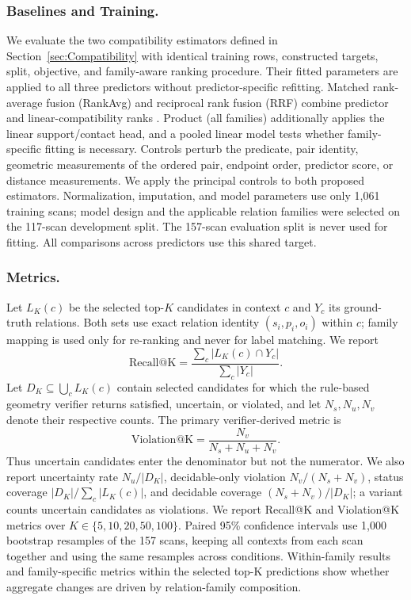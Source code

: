\documentclass[letterpaper]{article}
\begin{document}
\subsubsection{Baselines and Training.}
We evaluate the two compatibility estimators defined in Section~\ref{sec:Compatibility} with identical training rows, constructed targets, split, objective, and family-aware ranking procedure. Their fitted parameters are applied to all three predictors without predictor-specific refitting. Matched rank-average fusion (RankAvg) and reciprocal rank fusion (RRF) combine predictor and linear-compatibility ranks \cite{10.1145/1571941.1572114}. Product (all families) additionally applies the linear support/contact head, and a pooled linear model tests whether family-specific fitting is necessary. Controls perturb the predicate, pair identity, geometric measurements of the ordered pair, endpoint order, predictor score, or distance measurements. We apply the principal controls to both proposed estimators.
Normalization, imputation, and model parameters use only 1,061 training scans; model design and the applicable relation families were selected on the 117-scan development split. The 157-scan evaluation split is never used for fitting. All comparisons across predictors use this shared target.

\subsubsection{Metrics.}
Let $L_K(c)$ be the selected top-$K$ candidates in context $c$ and $Y_c$ its ground-truth relations. Both sets use exact relation identity $(s_i,p_i,o_i)$ within $c$; family mapping is used only for re-ranking and never for label matching. We report
\begin{equation}
\mathrm{Recall@K}=\frac{\sum_c |L_K(c)\cap Y_c|}{\sum_c |Y_c|}.
\end{equation}
Let $D_K\subseteq\bigcup_c L_K(c)$ contain selected candidates for which the rule-based geometry verifier returns satisfied, uncertain, or violated, and let $N_s,N_u,N_v$ denote their respective counts. The primary verifier-derived metric is
\begin{equation}
\mathrm{Violation@K}=\frac{N_v}{N_s+N_u+N_v}.
\end{equation}
Thus uncertain candidates enter the denominator but not the numerator. We also report uncertainty rate $N_u/|D_K|$, decidable-only violation $N_v/(N_s+N_v)$, status coverage $|D_K|/\sum_c|L_K(c)|$, and decidable coverage $(N_s+N_v)/|D_K|$; a variant counts uncertain candidates as violations. We report Recall@K and Violation@K metrics over $K \in \{5, 10, 20, 50, 100\}$. Paired 95\% confidence intervals use 1,000 bootstrap resamples of the 157 scans, keeping all contexts from each scan together and using the same resamples across conditions. Within-family results and family-specific metrics within the selected top-K predictions show whether aggregate changes are driven by relation-family composition.
\end{document}
